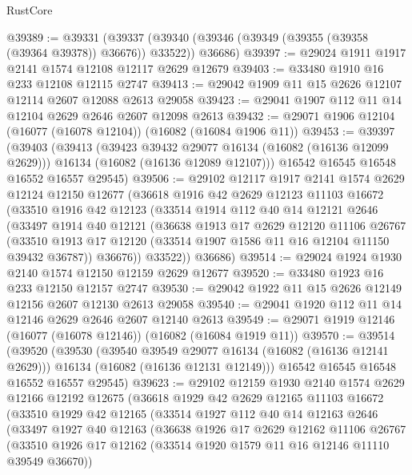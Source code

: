 \begin{lexlean}{RustCore}
\begin{coremodule}
@39389 := @39331
    (@39337 (@39340 (@39346 (@39349 (@39355 (@39358 (@39364 @39378)) @36676)) @33522)) @36686)
@39397 := @29024 @1911 @1917 @2141 @1574 @12108 @12117 @2629 @12679
@39403 := @33480 @1910 @16 @233 @12108 @12115 @2747
@39413 := @29042 @1909 @11 @15 @2626 @12107 @12114 @2607 @12088 @2613 @29058
@39423 := @29041 @1907 @112 @11 @14 @12104 @2629 @2646 @2607 @12098 @2613
@39432 := @29071 @1906 @12104 (@16077 (@16078 @12104)) (@16082 (@16084 @1906 @11))
@39453 := @39397
    (@39403
      (@39413
        (@39423 @39432 @29077 @16134 (@16082 (@16136 @12099 @2629)))
        @16134
        (@16082 (@16136 @12089 @12107)))
      @16542
      @16545
      @16548
      @16552
      @16557
      @29545)
@39506 := @29102
    @12117
    @1917
    @2141
    @1574
    @2629
    @12124
    @12150
    @12677
    (@36618
      @1916
      @42
      @2629
      @12123
      @11103
      @16672
      (@33510
        @1916
        @42
        @12123
        (@33514
          @1914
          @112
          @40
          @14
          @12121
          @2646
          (@33497
            @1914
            @40
            @12121
            (@36638
              @1913
              @17
              @2629
              @12120
              @11106
              @26767
              (@33510 @1913 @17 @12120 (@33514 @1907 @1586 @11 @16 @12104 @11150 @39432 @36787))
              @36676))
          @33522))
      @36686)
@39514 := @29024 @1924 @1930 @2140 @1574 @12150 @12159 @2629 @12677
@39520 := @33480 @1923 @16 @233 @12150 @12157 @2747
@39530 := @29042 @1922 @11 @15 @2626 @12149 @12156 @2607 @12130 @2613 @29058
@39540 := @29041 @1920 @112 @11 @14 @12146 @2629 @2646 @2607 @12140 @2613
@39549 := @29071 @1919 @12146 (@16077 (@16078 @12146)) (@16082 (@16084 @1919 @11))
@39570 := @39514
    (@39520
      (@39530
        (@39540 @39549 @29077 @16134 (@16082 (@16136 @12141 @2629)))
        @16134
        (@16082 (@16136 @12131 @12149)))
      @16542
      @16545
      @16548
      @16552
      @16557
      @29545)
@39623 := @29102
    @12159
    @1930
    @2140
    @1574
    @2629
    @12166
    @12192
    @12675
    (@36618
      @1929
      @42
      @2629
      @12165
      @11103
      @16672
      (@33510
        @1929
        @42
        @12165
        (@33514
          @1927
          @112
          @40
          @14
          @12163
          @2646
          (@33497
            @1927
            @40
            @12163
            (@36638
              @1926
              @17
              @2629
              @12162
              @11106
              @26767
              (@33510 @1926 @17 @12162 (@33514 @1920 @1579 @11 @16 @12146 @11110 @39549 @36670))

\end{coremodule}
\end{lexlean}
